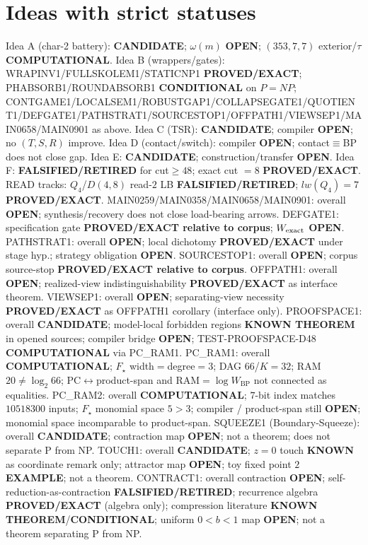 \documentclass[11pt]{article}
\begin{document}
\section*{Ideas with strict statuses}
Idea A (char-2 battery): \textbf{CANDIDATE}; $\omega(m)$ \textbf{OPEN}; $(353,7,7)$ exterior/$\tau$ \textbf{COMPUTATIONAL}.
Idea B (wrappers/gates): WRAPINV1/FULLSKOLEM1/STATICNP1 \textbf{PROVED/EXACT};
PHABSORB1/ROUNDABSORB1 \textbf{CONDITIONAL} on $P=NP$;
CONTGAME1/LOCALSEM1/ROBUSTGAP1/COLLAPSEGATE1/QUOTIENT1/DEFGATE1/PATHSTRAT1/SOURCESTOP1/OFFPATH1/VIEWSEP1/MAIN0658/MAIN0901 as above.
Idea C (TSR): \textbf{CANDIDATE}; compiler \textbf{OPEN}; no $(T,S,R)$ improve.
Idea D (contact/switch): compiler \textbf{OPEN}; contact$\equiv$BP does not close gap.
Idea E: \textbf{CANDIDATE}; construction/transfer \textbf{OPEN}.
Idea F: \textbf{FALSIFIED/RETIRED} for cut$\ge48$; exact cut $=8$ \textbf{PROVED/EXACT}.
READ tracks: $Q_4$/$D(4,8)$ read-$2$ LB \textbf{FALSIFIED/RETIRED}; $lw(Q_4)=7$ \textbf{PROVED/EXACT}.
MAIN0259/MAIN0358/MAIN0658/MAIN0901: overall \textbf{OPEN}; synthesis/recovery does not close load-bearing arrows.
DEFGATE1: specification gate \textbf{PROVED/EXACT relative to corpus}; $W_{\rm exact}$ \textbf{OPEN}.
PATHSTRAT1: overall \textbf{OPEN}; local dichotomy \textbf{PROVED/EXACT} under stage hyp.; strategy obligation \textbf{OPEN}.
SOURCESTOP1: overall \textbf{OPEN}; corpus source-stop \textbf{PROVED/EXACT relative to corpus}.
OFFPATH1: overall \textbf{OPEN}; realized-view indistinguishability \textbf{PROVED/EXACT} as interface theorem.
VIEWSEP1: overall \textbf{OPEN}; separating-view necessity \textbf{PROVED/EXACT} as OFFPATH1 corollary (interface only).
PROOFSPACE1: overall \textbf{CANDIDATE}; model-local forbidden regions \textbf{KNOWN THEOREM} in opened sources;
compiler bridge \textbf{OPEN}; TEST-PROOFSPACE-D48 \textbf{COMPUTATIONAL} via PC\_RAM1.
PC\_RAM1: overall \textbf{COMPUTATIONAL}; $F_\star$ width$=$degree$=3$; DAG $66$/$K{=}32$; RAM $20\neq\log_2 66$;
PC$\leftrightarrow$product-span and RAM$=\log W_{\mathrm{BP}}$ not connected as equalities.
PC\_RAM2: overall \textbf{COMPUTATIONAL}; $7$-bit index matches $10518300$ inputs; $F_\star$ monomial space $5{>}3$;
compiler / product-span still \textbf{OPEN}; monomial space incomparable to product-span.
SQUEEZE1 (Boundary-Squeeze): overall \textbf{CANDIDATE}; contraction map \textbf{OPEN}; not a theorem;
does not separate P from NP.
TOUCH1: overall \textbf{CANDIDATE}; $z{=}0$ touch \textbf{KNOWN} as coordinate remark only; attractor map \textbf{OPEN}; toy fixed point $2$ \textbf{EXAMPLE}; not a theorem.
CONTRACT1: overall contraction \textbf{OPEN}; self-reduction-as-contraction \textbf{FALSIFIED/RETIRED};
recurrence algebra \textbf{PROVED/EXACT} (algebra only); compression literature \textbf{KNOWN THEOREM}/\textbf{CONDITIONAL};
uniform $0{<}b{<}1$ map \textbf{OPEN}; not a theorem separating P from NP.
\end{document}
